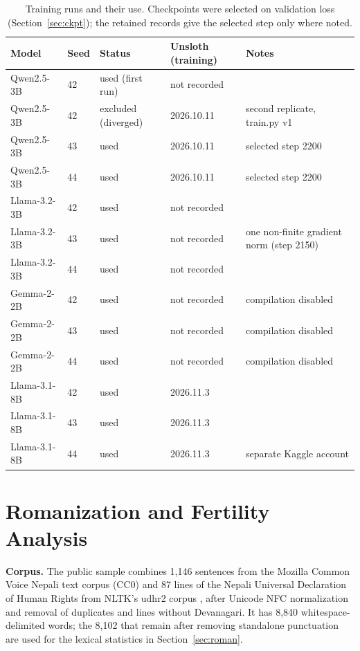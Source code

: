\documentclass{article}
\begin{document}
\begin{table}[H]
\centering
\fontsize{8.5}{10}\selectfont
\setlength{\tabcolsep}{3pt}
\caption{Training runs and their use. Checkpoints were selected on validation loss (Section~\ref{sec:ckpt}); the retained records give the selected step only where noted.}\label{tab:runs}
\begin{tabular}{@{}L{72.2pt}R{28.6pt}L{95.1pt}L{63.7pt}L{180.3pt}@{}}
\toprule
\textbf{Model} & \textbf{Seed} & \textbf{Status} & \textbf{Unsloth (training)} & \textbf{Notes} \\
\midrule
Qwen2.5-3B & 42 & used (first run) & not recorded &  \\
Qwen2.5-3B & 42 & excluded (diverged) & 2026.10.11 & second replicate, train.py v1 \\
Qwen2.5-3B & 43 & used & 2026.10.11 & selected step 2200 \\
Qwen2.5-3B & 44 & used & 2026.10.11 & selected step 2200 \\
Llama-3.2-3B & 42 & used & not recorded &  \\
Llama-3.2-3B & 43 & used & not recorded & one non-finite gradient norm (step 2150) \\
Llama-3.2-3B & 44 & used & not recorded &  \\
Gemma-2-2B & 42 & used & not recorded & compilation disabled \\
Gemma-2-2B & 43 & used & not recorded & compilation disabled \\
Gemma-2-2B & 44 & used & not recorded & compilation disabled \\
Llama-3.1-8B & 42 & used & 2026.11.3 &  \\
Llama-3.1-8B & 43 & used & 2026.11.3 &  \\
Llama-3.1-8B & 44 & used & 2026.11.3 & separate Kaggle account \\
\bottomrule
\end{tabular}
\end{table}

\section{Romanization and Fertility Analysis}\label{app:roman}

\textbf{Corpus.} The public sample combines 1,146 sentences from the Mozilla Common Voice Nepali text corpus (CC0) \citep{ardila2020} and 87 lines of the Nepali Universal Declaration of Human Rights from NLTK's udhr2 corpus \citep{bird2009}, after Unicode NFC normalization and removal of duplicates and lines without Devanagari. It has 8,840 whitespace-delimited words; the 8,102 that remain after removing standalone punctuation are used for the lexical statistics in Section~\ref{sec:roman}.
\end{document}
